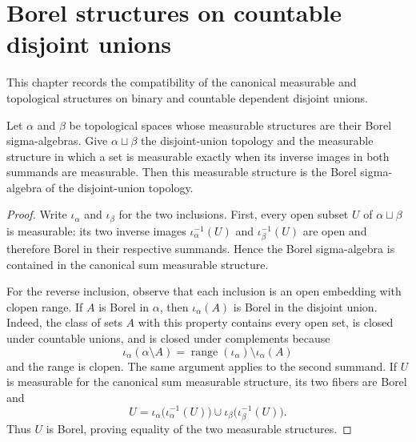 
\chapter{Borel structures on countable disjoint unions}
\label{chap:standard_borel_disjoint_unions}

This chapter records the compatibility of the canonical measurable and
topological structures on binary and countable dependent disjoint unions.

\begin{lemma}
  \label{lem:borel_space_sum}
  Let $\alpha$ and $\beta$ be topological spaces whose measurable structures
  are their Borel sigma-algebras.  Give $\alpha \sqcup \beta$ the disjoint-union
  topology and the measurable structure in which a set is measurable exactly
  when its inverse images in both summands are measurable.  Then this
  measurable structure is the Borel sigma-algebra of the disjoint-union
  topology.
\end{lemma}

\begin{proof}

\leanok
  Write $\iota_\alpha$ and $\iota_\beta$ for the two inclusions.
  First, every open subset $U$ of $\alpha \sqcup \beta$ is measurable: its two
  inverse images $\iota_\alpha^{-1}(U)$ and $\iota_\beta^{-1}(U)$ are open and
  therefore Borel in their respective summands.  Hence the Borel sigma-algebra
  is contained in the canonical sum measurable structure.

  For the reverse inclusion, observe that each inclusion is an open embedding
  with clopen range.  If $A$ is Borel in $\alpha$, then
  $\iota_\alpha(A)$ is Borel in the disjoint union.  Indeed, the class of sets
  $A$ with this property contains every open set, is closed under countable
  unions, and is closed under complements because
  \[
    \iota_\alpha(\alpha \setminus A)
      = \operatorname{range}(\iota_\alpha) \setminus \iota_\alpha(A)
  \]
  and the range is clopen.  The same argument applies to the second summand.
  If $U$ is measurable for the canonical sum measurable structure, its two
  fibers are Borel and
  \[
    U =
      \iota_\alpha\bigl(\iota_\alpha^{-1}(U)\bigr)
      \cup
      \iota_\beta\bigl(\iota_\beta^{-1}(U)\bigr).
  \]
  Thus $U$ is Borel, proving equality of the two measurable structures.
\end{proof}

